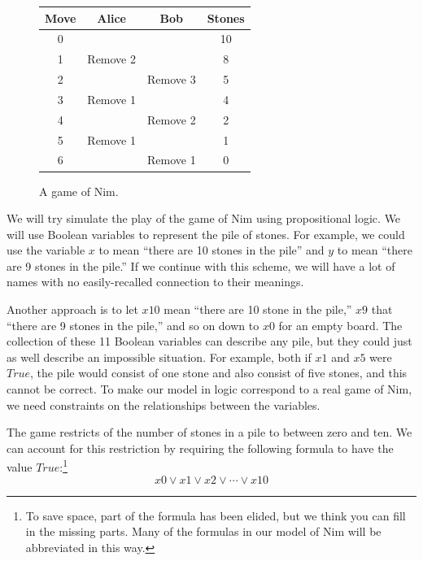 {{\begin{figure}
\begin{center}
\begin{tabular}{c|c|c|c}
Move & Alice     & Bob      & Stones \\
\hline
0    &           &          & 10     \\
1    & Remove 2  &          & 8      \\
2    &           & Remove 3 & 5      \\
3    & Remove 1  &          & 4      \\
4    &           & Remove 2 & 2      \\
5    & Remove 1  &          & 1      \\
6    &           & Remove 1 & 0      \\
\end{tabular}
\end{center}
\caption{A game of Nim.}
\label{fig:example-nim-game}
\end{figure}

We will try simulate the play of the game of Nim using propositional logic.
We will use Boolean variables to represent the pile of stones.
For example, we could use the variable $x$ to mean ``there are 10 stones in the pile''
and $y$ to mean ``there are 9 stones in the pile.''
If we continue with this scheme, we will have a lot of names with
no easily-recalled connection to their meanings.

Another approach is to let $x10$ mean ``there are 10 stone in the pile,''
$x9$ that ``there are 9 stones in the pile,'' and so on
down to $x0$ for an empty board.
The collection of these 11 Boolean variables can describe any pile,
but they could just as well describe an impossible situation.
For example, both if $x1$ and $x5$ were $True$,
the pile would consist of one stone and also consist of five stones,
and this cannot be correct.
To make our model in logic correspond to a real game of Nim,
we need constraints on the relationships between the variables.

The game restricts of the number
of stones in a pile to between zero and ten.
We can account for this restriction by requiring
the following formula to have the value $True$:\footnote{To
save space, part of the formula has
been elided, but we think you can fill in the missing parts.
Many of the formulas in our model of Nim will be abbreviated in this way.}
$$x0 \vee x1 \vee x2 \vee \cdots \vee x10$$

}}
